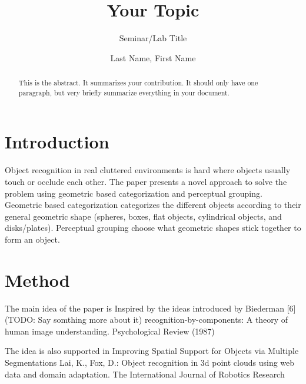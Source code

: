 \documentclass[runningheads,a4paper]{llncs}
\begin{document}
%
\frontmatter          %
%
\pagestyle{headings}  %
%
\mainmatter              %
%
\title{Your Topic}
\subtitle{Seminar/Lab Title}
%
%
\author{Last Name, First Name}
%

\maketitle              %

\begin{abstract}
    This is  the abstract. It summarizes your  contribution. It should only
    have one paragraph, but very briefly summarize everything in your document.
\end{abstract}

\section{Introduction}

Object recognition in real cluttered environments is hard where objects usually touch or occlude each other.
The paper presents a novel approach to solve the problem using geometric based categorization and perceptual grouping.
Geometric based categorization categorizes the different objects according to their general geometric shape (spheres, boxes, flat objects, cylindrical objects, and disks/plates).
Perceptual grouping choose what geometric shapes stick together to form an object.                                                      

\section{Method}
The main idea of the paper is Inspired by the ideas introduced by Biederman [6] (TODO: Say somthing more about it) recognition-by-components: A theory of human image understanding. Psychological Review (1987)

The idea is also supported in Improving Spatial Support for Objects
via Multiple Segmentations
Lai, K., Fox, D.: Object recognition in 3d point clouds using web data and domain
adaptation.  The International Journal of Robotics Research
\end{document}
